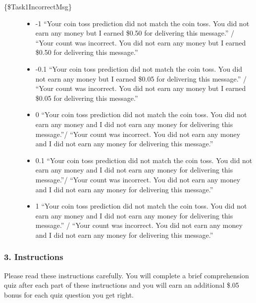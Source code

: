 \begin{description}
\item[\{\$Task1IncorrectMsg\}] \hspace{1cm}
\begin{itemize}
\item -1 ``Your coin toss prediction did not match the coin toss. You did not earn any
money but I earned \$0.50 for delivering this message.'' / ``Your count was
incorrect. You did not earn any money but I earned \$0.50 for delivering this
message.'' 

\item -0.1 ``Your coin toss prediction did not match the coin toss. You did
not earn any money but I earned \$0.05 for delivering this message.'' / ``Your
count was incorrect. You did not earn any money but I earned \$0.05 for
delivering this message.'' 

\item 0 ``Your coin toss prediction did not match the coin
toss. You did not earn any money and I did not earn any money for delivering
this message.''/ ``Your count was incorrect. You did not earn any money and I
did not earn any money for delivering this message.'' 

\item 0.1 ``Your coin toss
prediction did not match the coin toss. You did not earn any money and I did not
earn any money for delivering this message.''/ ``Your count was incorrect. You
did not earn any money and I did not earn any money for delivering this message.'' 

\item 1 ``Your coin toss prediction did not match the coin toss. You did not earn
any money and I did not earn any money for delivering this message.'' / ``Your
count was incorrect. You did not earn any money and I did not earn any money for
delivering this message.''
\end{itemize}
\end{description}

\subsubsection*{3. Instructions}
Please read these instructions carefully. You will complete a brief
comprehension quiz after each part of these instructions and you will earn an
additional \$.05 bonus for each quiz question you get right. 

